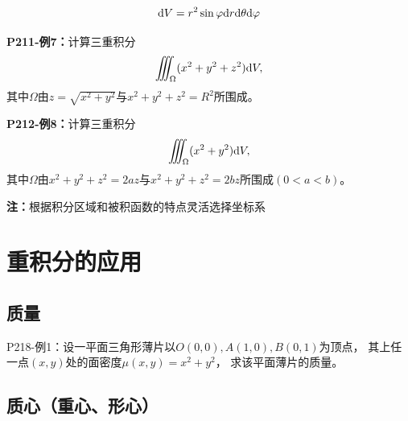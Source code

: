 \begin{center}
\end{center}

$$\mathrm{d} V=r^2\sin\varphi \mathrm{d} r\mathrm{d}\theta \mathrm{d}\varphi$$

{\bf P211-例7：}计算三重积分
$$\iiint_{\Omega}(x^2+y^2+z^2)\mathrm{d} V,$$
其中$\Omega$由$z=\sqrt{x^2+y^2}$与$x^2+y^2+z^2=R^2$所围成。

{\bf P212-例8：}计算三重积分
$$\iiint_{\Omega}(x^2+y^2)\mathrm{d} V,$$
其中$\Omega$由$x^2+y^2+z^2=2az$与$x^2+y^2+z^2=2bz$所围成$(0<a<b)$。

{\bf 注：}根据积分区域和被积函数的特点灵活选择坐标系

\section{重积分的应用}

\subsection{质量}

{P218-例1：}设一平面三角形薄片以$O(0,0),A(1,0),B(0,1)$为顶点，
其上任一点$(x,y)$处的面密度$\mu(x,y)=x^2+y^2$，
求该平面薄片的质量。

\subsection{质心（重心、形心）}

